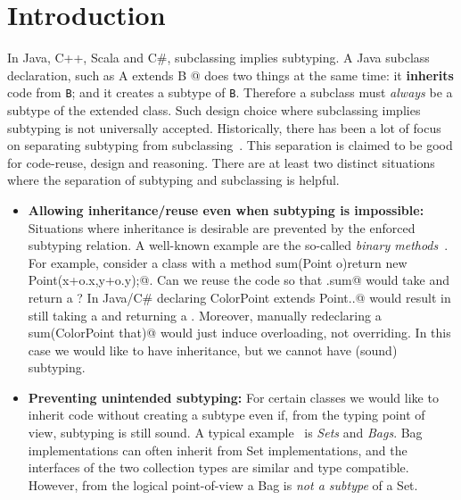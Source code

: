 \saveSpace
\section{Introduction}\label{sec:intro}
\saveSpace
In Java, C++, Scala and C\#, subclassing 
implies subtyping. A Java subclass declaration, such as 
\Q@class A extends B {}@
\noindent does two things at the same time:
it {\bf inherits} code from \lstinline{B}; and it creates
a subtype of \lstinline{B}. Therefore a subclass must \emph{always} be
a subtype of the extended class.
Such design choice where subclassing implies subtyping is not
universally accepted.
Historically, there has been a lot of focus on
separating subtyping from subclassing~\cite{cook}.  This separation is claimed to be
good for code-reuse, design and reasoning. There are at
least two distinct situations where the separation of subtyping and 
subclassing is helpful.

\begin{itemize}

\item {\bf Allowing inheritance/reuse even when subtyping is impossible:} 
Situations where inheritance is desirable are prevented
by the enforced subtyping relation. A well-known example are the so-called \emph{binary methods}~\cite{cook,bruce96binary}.
For example, consider a class \Q@Point@ with a method 
\Q@Point sum(Point o){return new Point(x+o.x,y+o.y);}@.
Can we reuse the \Q@Point@ code so that \Q@ColorPoint.sum@
would take and return a \Q@ColorPoint@?
In Java/C\# declaring \Q@class ColorPoint extends Point{..}@ would result
in \Q@sum@ still taking a \Q@Point@ and returning a \Q@Point@.
Moreover, manually redeclaring a \Q@ColorPoint sum(ColorPoint that)@
would just induce overloading, not overriding.
In this case we would like to have inheritance, but we cannot
have (sound) subtyping.
%

\item {\bf Preventing unintended subtyping:} For certain classes we
  would like to inherit code without creating a subtype even if, from
  the typing point of view, subtyping is still sound. A typical
  example~\cite{LaLonde:1991:SSS:110673.110679} is \emph{Sets} and
  \emph{Bags}. Bag implementations can often inherit 
  from Set implementations, and the interfaces of the two collection types are
  similar and type compatible. 
  However, from the logical point-of-view a Bag is \emph{not a
    subtype} of a Set. 

\end{itemize}

